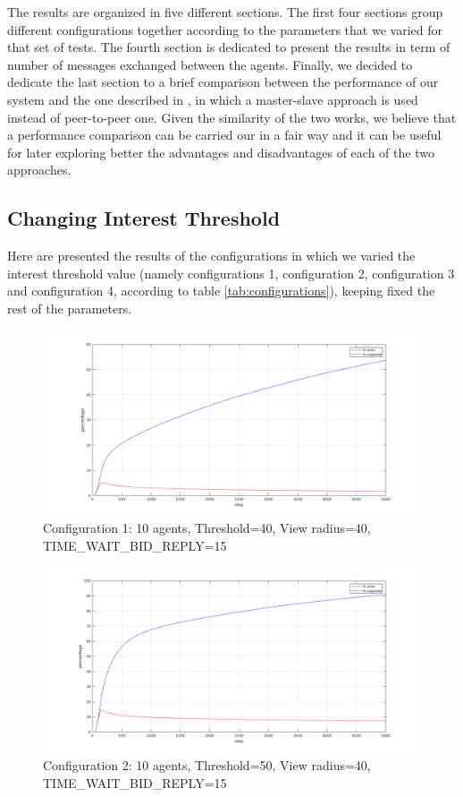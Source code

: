 \documentclass[a4paper, 10pt, conference]{ieeeconf}      %
\begin{document}
The results are organized in five different sections. The first four sections group different configurations together according to the parameters that we varied for that set of tests. The fourth section is dedicated to present the results in term of number of messages exchanged between the agents. Finally, we decided to dedicate the last section to a brief comparison between the performance of our system and the one described in \cite{tavaresgaspar}, in which a master-slave approach is used instead of peer-to-peer one. Given the similarity of the two works, we believe that a performance comparison can be carried our in a fair way and it can be useful for later exploring better the advantages and disadvantages of each of the two approaches. 



\subsection{Changing Interest Threshold}
Here are presented the results of the configurations in which we varied the interest threshold value (namely configurations 1, configuration 2, configuration 3 and configuration 4, according to table \ref{tab:configurations}), keeping fixed the rest of the parameters. 
\begin{figure}[H]
	\centering
	\includegraphics[width=1\linewidth]{img/config1.png}
	\caption{Configuration 1: 10 agents, Threshold=40, View radius=40, TIME\_WAIT\_BID\_REPLY=15}
	\label{fig:config1}
\end{figure}
\begin{figure}[H]
	\centering
	\includegraphics[width=1\linewidth]{img/config2.png}
	\caption{Configuration 2: 10 agents, Threshold=50, View radius=40, TIME\_WAIT\_BID\_REPLY=15}
	\label{fig:config2}
\end{figure}
\end{document}
